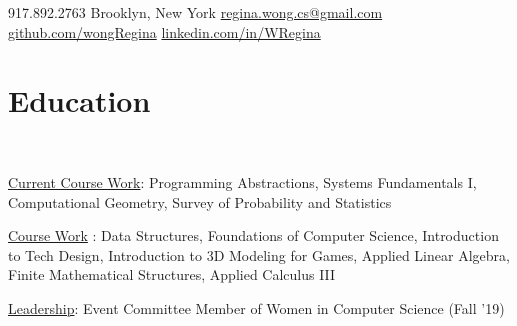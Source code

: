 \documentclass[]{deedy-resume-openfont}
\begin{document}
%
%
\lastupdated

%
%

{ \faMobilePhone \hspace{0.1 in} 917.892.2763}
{ \faMapMarker \hspace{0.1 in}Brooklyn, New York}
{\href{mailto:regina.wong.cs@gmail.com}{ \faEnvelopeSquare \hspace{0.1 in} regina.wong.cs@gmail.com}}
{ \href{https://github.com/wongRegina}{\faGithubSquare\hspace{0.1 in} github.com/wongRegina}}
{\href{https://www.linkedin.com/in/wregina}{ \faLinkedinSquare \hspace{0.1 in} linkedin.com/in/WRegina}}
\section{Education}

\\

\hspace{0.1 in} \underline{Current Course Work}: Programming Abstractions, Systems Fundamentals I, Computational Geometry, Survey of Probability and Statistics

\hspace{0.1 in } \underline{Course Work} :  Data Structures, Foundations of Computer Science, Introduction to Tech Design, Introduction to 3D Modeling for Games, Applied Linear Algebra, Finite Mathematical Structures, Applied Calculus III

\hspace{0.1 in} \underline{Leadership}: Event Committee Member of Women in Computer Science (Fall '19)
\sectionsep
\end{document}
